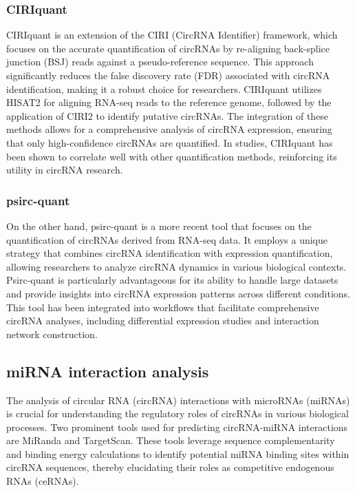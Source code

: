 \subsubsection{CIRIquant}
CIRIquant is an extension of the CIRI (CircRNA Identifier) framework, which
focuses on the accurate quantification of circRNAs by re-aligning back-splice
junction (BSJ) reads against a pseudo-reference sequence.
This approach significantly reduces the false discovery rate (FDR) associated
with circRNA identification, making it a robust choice for
researchers\supercite{zhang_accurate_2020}.
CIRIquant utilizes HISAT2 for aligning RNA-seq reads to the reference genome,
followed by the application of CIRI2 to identify putative circRNAs.
The integration of these methods allows for a comprehensive analysis of circRNA
expression, ensuring that only high-confidence circRNAs are
quantified\supercite{munz_exonintron_2021,made_circrna-mirna-mrna_2023}.
In studies, CIRIquant has been shown to correlate well with other
quantification methods, reinforcing its utility in circRNA
research\supercite{zhang_accurate_2020}.

\subsubsection{psirc-quant}
On the other hand, psirc-quant is a more recent tool that focuses on the
quantification of circRNAs derived from RNA-seq data.
It employs a unique strategy that combines circRNA identification with
expression quantification, allowing researchers to analyze circRNA dynamics in
various biological contexts.
Psirc-quant is particularly advantageous for its ability to handle large
datasets and provide insights into circRNA expression patterns across different
conditions\supercite{yu_quantifying_2021}.
This tool has been integrated into workflows that facilitate comprehensive
circRNA analyses, including differential expression studies and interaction
network construction\supercite{zhang_expression_2022}.

\subsection{miRNA interaction analysis}
The analysis of circular RNA (circRNA) interactions with microRNAs (miRNAs) is
crucial for understanding the regulatory roles of circRNAs in various
biological processes.
Two prominent tools used for predicting circRNA-miRNA interactions are MiRanda
and TargetScan.
These tools leverage sequence complementarity and binding energy calculations
to identify potential miRNA binding sites within circRNA sequences, thereby
elucidating their roles as competitive endogenous RNAs (ceRNAs).

